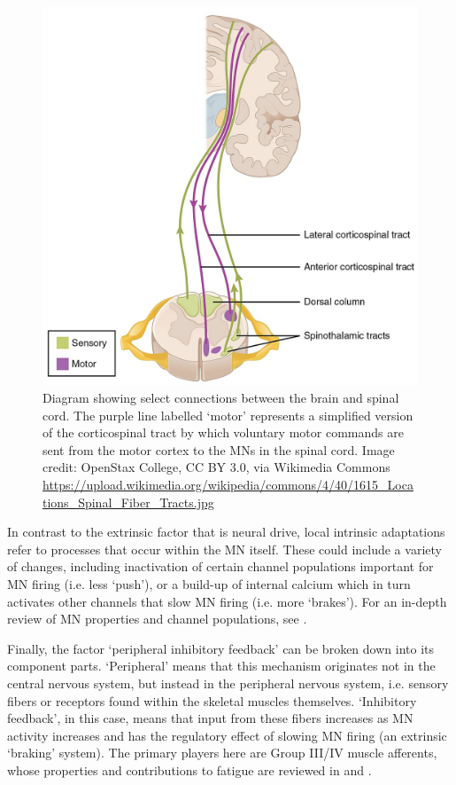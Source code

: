 \documentclass{article}
\begin{document}
\begin{figure}[!htbp]
\centering
\includegraphics[width=0.7\linewidth]{files/EPpXta8zJdzN048lz8AR-2f1fa6b1e3e30668e32932a0d8625d34.jpeg}
\caption[]{Diagram showing select connections between the brain and spinal cord. The purple line labelled `motor' represents a simplified version of the corticospinal tract by which voluntary motor commands are sent from the motor cortex to the MNs in the spinal cord. Image credit: OpenStax College, CC BY 3.0, via Wikimedia Commons \href{https://upload.wikimedia.org/wikipedia/commons/4/40/1615\_Locations\_Spinal\_Fiber\_Tracts.jpg}{https://upload.wikimedia.org/wikipedia/commons/4/40/1615\_Locations\_Spinal\_Fiber\_Tracts.jpg}}
\label{v9sdMy2gYd}
\end{figure}

In contrast to the extrinsic factor that is neural drive, local intrinsic adaptations refer to processes that occur within the MN itself. These could include a variety of changes, including inactivation of certain channel populations important for MN firing (i.e. less `push'), or a build-up of internal calcium which in turn activates other channels that slow MN firing (i.e. more `brakes'). For an in-depth review of MN properties and channel populations, see \citet{heckman2012motor}.

Finally, the factor `peripheral inhibitory feedback' can be broken down into its component parts. `Peripheral' means that this mechanism originates not in the central nervous system, but instead in the peripheral nervous system, i.e. sensory fibers or receptors found within the skeletal muscles themselves. `Inhibitory feedback', in this case, means that input from these fibers increases as MN activity increases and has the regulatory effect of slowing MN firing (an extrinsic `braking' system). The primary players here are Group III/IV muscle afferents, whose properties and contributions to fatigue are reviewed in \citet{gandevia2001spinal} and \citet{taylor2016neural}.
\end{document}
